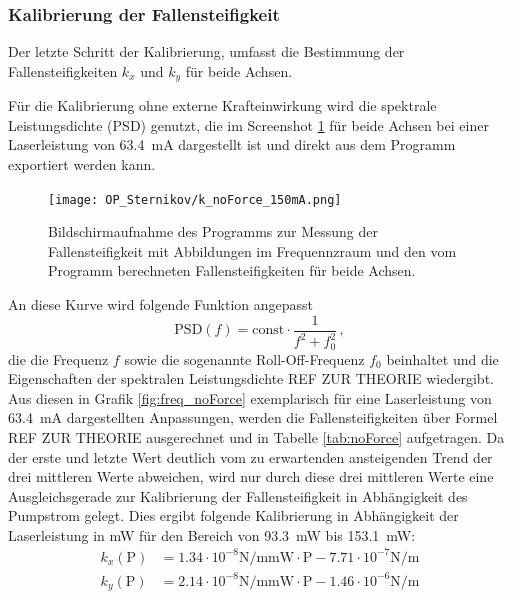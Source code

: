         \newpage
        \subsubsection{Kalibrierung der Fallensteifigkeit}
            Der letzte Schritt der Kalibrierung, umfasst die Bestimmung der Fallensteifigkeiten $k_x$ und $k_y$ für beide Achsen.
            
            Für die Kalibrierung ohne externe Krafteinwirkung wird die spektrale Leistungsdichte (PSD) genutzt, die im Screenshot \ref{fig:PSD} für beide Achsen bei einer Laserleistung von 
            \SI{63.4}{\milli\ampere} dargestellt ist und direkt aus dem Programm exportiert werden kann. 
            \begin{figure}[h]
            \centering
            \texttt{[image: OP\_Sternikov/k\_noForce\_150mA.png]}
            \caption{Bildschirmaufnahme des Programms zur Messung der Fallensteifigkeit mit Abbildungen im Frequennzraum und den vom Programm berechneten Fallensteifigkeiten für beide Achsen.}
            \label{fig:PSD}
            \end{figure}
            \FloatBarrier
            An diese Kurve wird folgende Funktion angepasst
            \begin{equation*}
                \text{PSD}(f) = \text{const} \cdot \frac{1}{f^2+f_0^2} \, ,
            \end{equation*}
            die die Frequenz $f$ sowie die sogenannte Roll-Off-Frequenz $f_0$ beinhaltet und die Eigenschaften der spektralen Leistungsdichte REF ZUR THEORIE wiedergibt. Aus diesen in Grafik 
            \ref{fig:freq_noForce} exemplarisch für eine Laserleistung von \SI{63.4}{\milli\ampere} dargestellten Anpassungen, werden die Fallensteifigkeiten über Formel REF ZUR THEORIE ausgerechnet und in Tabelle
            \ref{tab:noForce} aufgetragen. Da der erste und letzte Wert deutlich vom zu erwartenden ansteigenden Trend der drei mittleren Werte abweichen, wird nur durch diese drei mittleren Werte eine Ausgleichsgerade zur 
            Kalibrierung der Fallensteifigkeit in Abhängigkeit des Pumpstrom gelegt. Dies ergibt folgende Kalibrierung in Abhängigkeit der Laserleistung in \si{\milli\watt} für den Bereich 
            von \SI{93.3}{\milli\watt} bis \SI{153.1}{\milli\watt}:
            \begin{align}
                k_x(\text{P}) &= 1.34\cdot10^{-8}\si{\newton\per\metre\milli\watt} \cdot \text{P} - 7.71\cdot10^{-7}\si{\newton\per\metre} \\
                k_y(\text{P}) &= 2.14\cdot10^{-8}\si{\newton\per\metre\milli\watt} \cdot \text{P} - 1.46\cdot10^{-6}\si{\newton\per\metre}
            \end{align}
